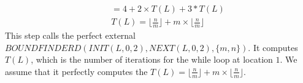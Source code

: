 \begin{enumerate}
\[\begin{array}{l}
  \\ \qquad 
  = 4 + 2 \times T(L) + 3 * T(L)
  \\ \qquad
  T(L) = \lfloor \frac{n}{m} \rfloor + m \times \lfloor \frac{n}{m} \rfloor
\end{array}
\]
This step calls the perfect external
\\
$BOUNDFINDERD(INIT(L, 0, 2), NEXT(L, 0, 2), \{m, n\})$.
It computes $T(L)$, which is the number of iterations for the while loop at location $1$.
We assume that it perfectly computes the $T(L) = \lfloor \frac{n}{m} \rfloor + m \times \lfloor \frac{n}{m} \rfloor$.
\end{enumerate}
